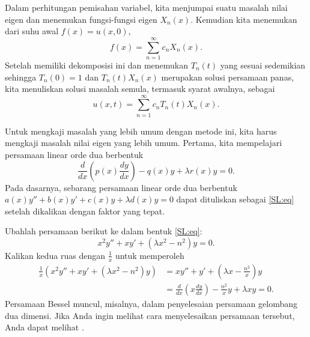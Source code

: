 Dalam perhitungan pemisahan variabel,
kita menjumpai suatu masalah nilai eigen dan menemukan
fungsi-fungsi eigen
$X_n(x)$.  Kemudian kita menemukan \emph{} dari
suhu awal
$f(x) = u(x,0)$,
\begin{equation*}
f(x) = \sum_{n=1}^\infty c_n X_n(x) .
\end{equation*}
Setelah memiliki dekomposisi ini
dan menemukan $T_n(t)$ yang sesuai sedemikian sehingga $T_n(0) = 1$
dan $T_n(t)X_n(x)$ merupakan solusi persamaan panas,
kita menuliskan solusi masalah semula, termasuk syarat
awalnya, sebagai
\begin{equation*}
u(x,t) = \sum_{n=1}^\infty c_n T_n(t) X_n(x) .
\end{equation*}

\medskip

Untuk mengkaji masalah yang lebih umum dengan metode ini, kita harus mengkaji
masalah nilai eigen yang lebih umum.
Pertama, kita mempelajari 
persamaan linear orde dua berbentuk
\begin{equation} \label{SL:eq}
\frac{d}{dx} \left( p(x) \frac{dy}{dx} \right)
- q(x) y + \lambda r(x) y = 0 .
\end{equation}
Pada dasarnya,
sebarang persamaan linear orde dua
berbentuk $a(x) y'' + b(x) y' + c(x) y + \lambda d(x) y = 0$
dapat dituliskan sebagai \eqref{SL:eq}
setelah dikalikan dengan faktor yang tepat.

\begin{example}[Bessel]
Ubahlah persamaan berikut ke dalam bentuk \eqref{SL:eq}:
\begin{equation*}
x^2 y'' + xy' + \left(\lambda x^2 - n^2\right)y = 0 .
\end{equation*}
Kalikan kedua ruas dengan $\frac{1}{x}$ untuk memperoleh
\begin{equation*}
\begin{split}
\frac{1}{x} \left( x^2 y'' + xy' + \left(\lambda x^2 - n^2\right)y \right)
& =
x y'' + y' + \left(\lambda x - \frac{n^2}{x}\right)y 
\\
& =
\frac{d}{dx} \left( x \frac{dy}{dx} \right)
- \frac{n^2}{x} y + \lambda x y  = 0.
\end{split}
\end{equation*}
Persamaan Bessel muncul, misalnya, dalam penyelesaian
persamaan gelombang dua dimensi.
Jika Anda ingin melihat cara menyelesaikan persamaan tersebut,
Anda dapat melihat .
\end{example}

